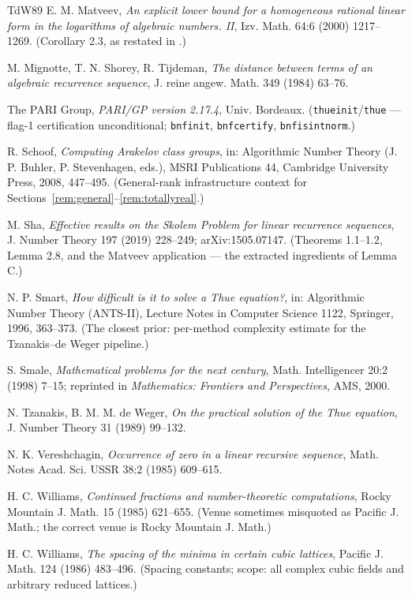 \documentclass[11pt]{amsart}
\theoremstyle{plain}
\theoremstyle{remark}
\begin{document}
\begin{thebibliography}{TdW89}
 E. M. Matveev, \emph{An explicit lower bound
  for a homogeneous rational linear form in the logarithms of
  algebraic numbers. II}, Izv. Math. 64:6 (2000) 1217--1269.
  (Corollary 2.3, as restated in \cite[\S 2.4]{Sha19}.)

 M. Mignotte, T. N. Shorey, R. Tijdeman,
  \emph{The distance between terms of an algebraic recurrence
  sequence}, J. reine angew. Math. 349 (1984) 63--76.

 The PARI Group, \emph{PARI/GP version 2.17.4},
  Univ. Bordeaux. (\texttt{thueinit}/\texttt{thue} --- flag-1
  certification unconditional; \texttt{bnfinit},
  \texttt{bnfcertify}, \texttt{bnfisintnorm}.)

 R. Schoof, \emph{Computing Arakelov class
  groups}, in: Algorithmic Number Theory (J. P. Buhler,
  P. Stevenhagen, eds.), MSRI Publications 44, Cambridge University
  Press, 2008, 447--495. (General-rank infrastructure context for
  Sections~\ref{rem:general}--\ref{rem:totallyreal}.)

 M. Sha, \emph{Effective results on the Skolem
  Problem for linear recurrence sequences}, J. Number Theory 197
  (2019) 228--249; arXiv:1505.07147. (Theorems 1.1--1.2, Lemma 2.8,
  and the Matveev application --- the extracted ingredients of
  Lemma C.)

 N. P. Smart, \emph{How difficult is it to
  solve a Thue equation?}, in: Algorithmic Number Theory (ANTS-II),
  Lecture Notes in Computer Science 1122, Springer, 1996, 363--373.
  (The closest prior: per-method complexity estimate for the
  Tzanakis--de Weger pipeline.)

 S. Smale, \emph{Mathematical problems for the
  next century}, Math. Intelligencer 20:2 (1998) 7--15; reprinted in
  \emph{Mathematics: Frontiers and Perspectives}, AMS, 2000.

 N. Tzanakis, B. M. M. de Weger, \emph{On the
  practical solution of the Thue equation}, J. Number Theory 31
  (1989) 99--132.

 N. K. Vereshchagin, \emph{Occurrence of zero
  in a linear recursive sequence}, Math. Notes Acad. Sci. USSR 38:2
  (1985) 609--615.

 H. C. Williams, \emph{Continued fractions and
  number-theoretic computations}, Rocky Mountain J. Math. 15 (1985)
  621--655. (Venue sometimes misquoted as Pacific J. Math.; the
  correct venue is Rocky Mountain J. Math.)

 H. C. Williams, \emph{The spacing of the
  minima in certain cubic lattices}, Pacific J. Math. 124 (1986)
  483--496. (Spacing constants; scope: all complex cubic fields and
  arbitrary reduced lattices.)

\end{thebibliography}
\end{document}
